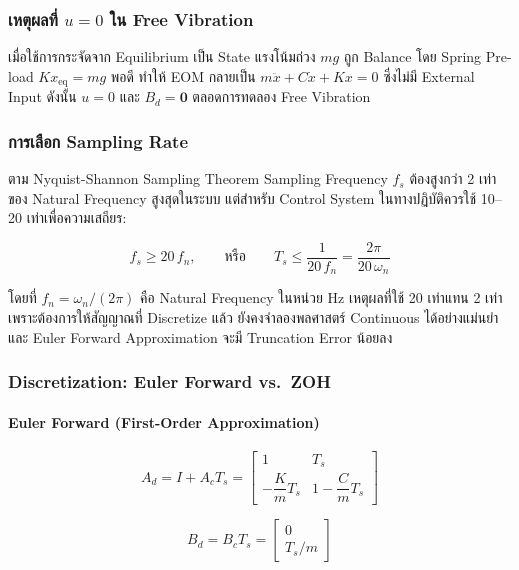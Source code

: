 \subsubsection{เหตุผลที่ $u = 0$ ใน Free Vibration}

เมื่อใช้การกระจัดจาก Equilibrium เป็น State แรงโน้มถ่วง $mg$
ถูก Balance โดย Spring Pre-load $Kx_\text{eq} = mg$ พอดี
ทำให้ EOM กลายเป็น $m\ddot{x} + C\dot{x} + Kx = 0$
ซึ่งไม่มี External Input ดังนั้น $u = 0$ และ $B_d = \mathbf{0}$
ตลอดการทดลอง Free Vibration

\subsubsection{การเลือก Sampling Rate}

ตาม Nyquist-Shannon Sampling Theorem Sampling Frequency $f_s$
ต้องสูงกว่า 2 เท่าของ Natural Frequency สูงสุดในระบบ
แต่สำหรับ Control System ในทางปฏิบัติควรใช้ 10--20 เท่าเพื่อความเสถียร:

\begin{equation}
    f_s \geq 20\, f_n, \qquad \text{หรือ} \qquad
    T_s \leq \frac{1}{20\, f_n} = \frac{2\pi}{20\,\omega_n}
    \label{eq:sampling_criterion}
\end{equation}

โดยที่ $f_n = \omega_n / (2\pi)$ คือ Natural Frequency ในหน่วย Hz
เหตุผลที่ใช้ 20 เท่าแทน 2 เท่า เพราะต้องการให้สัญญาณที่ Discretize แล้ว
ยังคงจำลองพลศาสตร์ Continuous ได้อย่างแม่นยำ
และ Euler Forward Approximation จะมี Truncation Error น้อยลง

\subsubsection{Discretization: Euler Forward vs.\ ZOH}

\paragraph{Euler Forward (First-Order Approximation)}

\begin{equation}
    A_d = I + A_c T_s =
    \begin{bmatrix} 1 & T_s \\ -\dfrac{K}{m}T_s & 1 - \dfrac{C}{m}T_s \end{bmatrix}
    \label{eq:euler_Ad}
\end{equation}

\begin{equation}
    B_d = B_c T_s = \begin{bmatrix} 0 \\ T_s/m \end{bmatrix}
    \label{eq:euler_Bd}
\end{equation}

